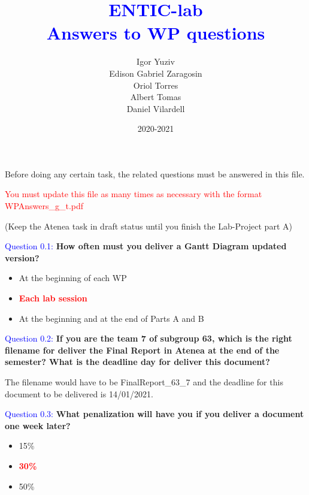 \documentclass[12pt, a4papre]{article}
\author{	
		Igor Yuziv\\
		Edison Gabriel Zaragosin\\
		Oriol Torres\\
		Albert Tomas\\
		Daniel Vilardell}
\title{\textbf{\textcolor{blue}{ENTIC-lab\\
	Answers to WP questions}}}
\date{2020-2021}
\begin{document}
	
	\maketitle
	\newpage
	\begin{center}
	\footnotesize{
		Before doing any certain task, the related questions must be answered in this file.
		
		\textcolor{red}{You must update this file as many times as necessary with the format WPAnswers\_g\_t.pdf}
		
 		(Keep the Atenea task in draft status until you finish the Lab-Project part A)
		}
	\end{center}

	\textcolor{blue}{Question 0.1:} \textbf{How often must you deliver a Gantt Diagram updated version?}
	\begin{itemize}
		\item At the beginning of each WP
		\item \textcolor{red}{ \textbf{Each lab session}}
		\item At the beginning and at the end of Parts A and B
	\end{itemize}
	
	\textcolor{blue}{Question 0.2:} \textbf{If you are the team 7 of subgroup 63, which is the right filename for deliver the Final Report in Atenea at the end of the semester? What is the deadline day for deliver this document?}
	
	The filename would have to be FinalReport\_63\_7 and the deadline for this document to be delivered is 14/01/2021.
	
	\textcolor{blue}{Question 0.3:} \textbf{What penalization will have you if you deliver a document one week later?}
	\begin{itemize}
		\item 15\%
		\item \textcolor{red}{ \textbf{30\%}}
		\item 50\%
	\end{itemize}
	
\end{document}
